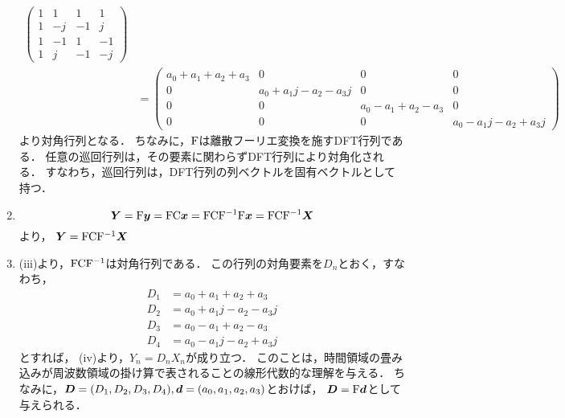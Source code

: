 \begin{enumerate}[label=(\roman*)]
\begin{align}
            \begin{pmatrix}
              1 &  1 &  1&  1\\
              1 & -j & -1&  j\\
              1 & -1 &  1& -1\\
              1 &  j & -1& -j
            \end{pmatrix}
          \\
          &= 
            \begin{pmatrix}
              a_0 + a_1 + a_2 + a_3 &  0 &  0&  0\\
              0 & a_0 + a_1 j - a_2 - a_3 j &  0&  0\\
              0 &  0 & a_0 - a_1 + a_2 - a_3 &  0\\
              0 &  0 &  0& a_0 - a_1 j - a_2 + a_3 j
            \end{pmatrix}
      \end{align}
      より対角行列となる．
      ちなみに，$\mathrm{F}$は離散フーリエ変換を施すDFT行列である．
      任意の巡回行列は，その要素に関わらずDFT行列により対角化される．
      すなわち，巡回行列は，DFT行列の列ベクトルを固有ベクトルとして持つ．
    \item
      \begin{equation}
        \boldsymbol{Y} = \mathrm{F}\boldsymbol{y} = \mathrm{F}\mathrm{C}\boldsymbol{x} = \mathrm{F}\mathrm{C}\mathrm{F}^{-1}\mathrm{F}\boldsymbol{x} = \mathrm{F}\mathrm{C}\mathrm{F}^{-1}\boldsymbol{X}
      \end{equation}
      より，
      $\boldsymbol{Y} = \mathrm{F}\mathrm{C}\mathrm{F}^{-1}\boldsymbol{X}$
    \item (iii)より，$\mathrm{F}\mathrm{C}\mathrm{F}^{-1}$は対角行列である．
      この行列の対角要素を$D_n$とおく，すなわち，
      \begin{align}
        D_1 &= a_0 + a_1 + a_2 + a_3\\
        D_2 &= a_0 + a_1 j - a_2 - a_3 j\\
        D_3 &= a_0 - a_1 + a_2 - a_3\\
        D_4 &= a_0 - a_1 j - a_2 + a_3 j
      \end{align}
      とすれば，
      (iv)より，$Y_n = D_n X_n$が成り立つ．
      このことは，時間領域の畳み込みが周波数領域の掛け算で表されることの線形代数的な理解を与える．
      ちなみに，$\boldsymbol{D} = (D_1, D_2, D_3, D_4), \boldsymbol{d} = (a_0, a_1, a_2, a_3)$とおけば，
      $\boldsymbol{D} = \mathrm{F} \boldsymbol{d}$として与えられる．
    \end{enumerate}
        

